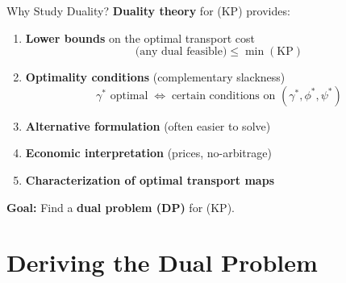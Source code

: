 \documentclass[aspectratio=169]{beamer}
\begin{document}
\begin{frame}{Why Study Duality?}
\textbf{Duality theory} for (KP) provides:

\vspace{0.3cm}
\begin{enumerate}
    \item \textbf{Lower bounds} on the optimal transport cost
    \[
    \text{(any dual feasible)} \leq \min(\text{KP})
    \]

    \vspace{0.2cm}
    \item \textbf{Optimality conditions} (complementary slackness)
    \[
    \gamma^* \text{ optimal} \;\Leftrightarrow\; \text{certain conditions on } (\gamma^*, \phi^*, \psi^*)
    \]

    \vspace{0.2cm}
    \item \textbf{Alternative formulation} (often easier to solve)

    \vspace{0.2cm}
    \item \textbf{Economic interpretation} (prices, no-arbitrage)

    \vspace{0.2cm}
    \item \textbf{Characterization of optimal transport maps}
\end{enumerate}

\vspace{0.4cm}
\textbf{Goal:} Find a \textbf{dual problem (DP)} for (KP).
\end{frame}

\section{Deriving the Dual Problem}
\end{document}
